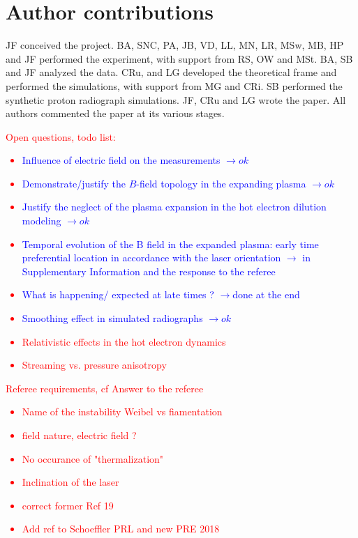 \documentclass[aps,twocolumn,showpacs,superscriptaddress]{revtex4}
\begin{document}
\section*{Author contributions}
JF conceived the project. BA, SNC, PA, JB, VD, LL, MN, LR, MSw, MB, HP and JF performed the experiment, with support from RS, OW and MSt.  BA, SB and JF analyzed the data. CRu, and LG developed the theoretical frame and performed the simulations, with support from MG and CRi. SB performed the synthetic proton radiograph simulations. JF, CRu and LG wrote the paper. All authors commented the paper at its various stages.

\textcolor{red}{
Open questions, todo list:
\begin{itemize}
\item \textcolor{blue}{ Influence of electric field on the measurements $\rightarrow ok $ }
\item \textcolor{blue}{ Demonstrate/justify the $B$-field topology in the expanding plasma $\rightarrow ok $ }
\item \textcolor{blue}{Justify the neglect of the plasma expansion in the hot electron dilution modeling $\rightarrow ok $ }
\item  \textcolor{blue}{ Temporal evolution of the B field in the expanded plasma: early time preferential location in accordance with the laser orientation $\rightarrow$ in Supplementary Information and the response to the referee}
\item  \textcolor{blue}{ What is happening/ expected at late times ? $\rightarrow $done at the end }
\item  \textcolor{blue}{ Smoothing effect in simulated radiographs $\rightarrow ok $}
\item Relativistic effects in the hot electron dynamics
\item Streaming vs. pressure anisotropy
\end{itemize}
}

\textcolor{red}{
Referee requirements, cf Answer to the referee
\begin{itemize}
\item Name of the instability Weibel vs fiamentation
\item field nature, electric field ?
\item No occurance of "thermalization"
\item Inclination of the laser
\item correct former Ref 19
\item Add ref to Schoeffler PRL and new PRE 2018
\end{itemize}
}



\end{document}
